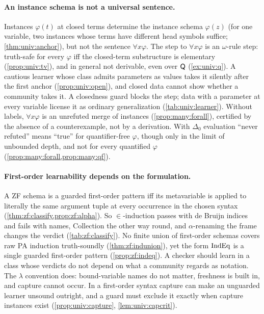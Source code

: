 \paragraph{An instance schema is not a universal sentence.}
Instances $\varphi(t)$ at closed terms determine the instance schema $\varphi(z)$ (for one variable, two instances whose
terms have different head symbols suffice; \cref{thm:univ:anchor}), but not the sentence $\forall x\varphi$. The step to
$\forall x\varphi$ is an $\omega$-rule step: truth-safe for every $\varphi$ iff the closed-term substructure is
elementary (\cref{prop:univ:tv}), and in general not derivable, even over $\mathsf{Q}$ (\cref{ex:univ:q}). A cautious learner
whose class admits parameters as values takes it silently after the first anchor (\cref{prop:univ:open}), and closed
data cannot show whether a community takes it. A closedness guard blocks the step; data with a parameter at every
variable license it as ordinary generalization (\cref{tab:univ:learner}). Without labels, $\forall x\varphi$ is an
unrefuted merge of instances (\cref{prop:many:forall}), certified by the absence of a counterexample, not by a
derivation. With $\Delta_0$ evaluation ``never refuted'' means ``true'' for quantifier-free $\varphi$, though only in the
limit of unbounded depth, and not for every quantified $\varphi$ (\cref{prop:many:forall,prop:many:qf}).

\paragraph{First-order learnability depends on the formulation.}
A ZF schema is a guarded first-order pattern iff its metavariable is applied to literally the same argument tuple at
every occurrence in the chosen syntax (\cref{thm:zf:classify,prop:zf:alpha}). So $\in$-induction passes with de Bruijn
indices and fails with names, Collection the other way round, and $\alpha$-renaming the frame changes the verdict
(\cref{tab:zf:classify}). No finite union of first-order schemas covers raw PA induction truth-soundly
(\cref{thm:zf:indunion}), yet the form $\mathrm{IndEq}$ is a single guarded first-order pattern (\cref{prop:zf:indeq}). A
checker should learn in a class whose verdicts do not depend on what a community regards as notation. The $\lambda$
convention does: bound-variable names do not matter, freshness is built in, and capture cannot occur. In a first-order
syntax capture can make an unguarded learner unsound outright, and a guard must exclude it exactly when capture
instances exist (\cref{prop:univ:capture}, \cref{lem:univ:capcrit}).


